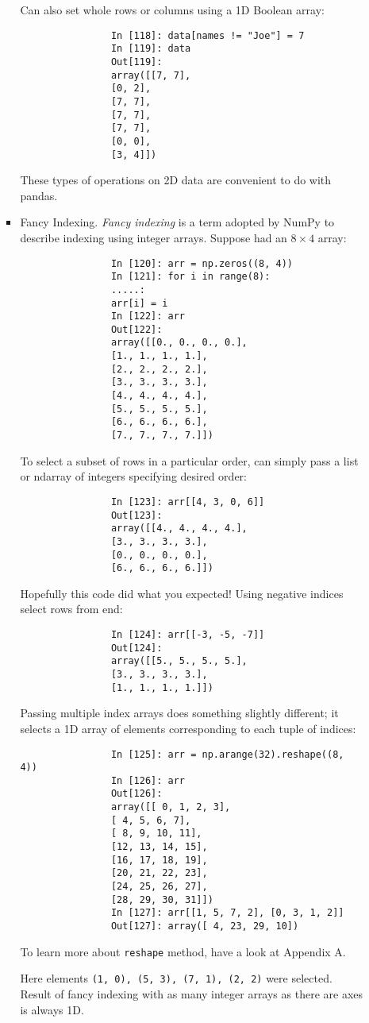 \documentclass{article}
\begin{document}
\begin{itemize}
\begin{itemize}
\begin{itemize}
			Can also set whole rows or columns using a 1D Boolean array:
			\begin{verbatim}
				In [118]: data[names != "Joe"] = 7
				In [119]: data
				Out[119]:
				array([[7, 7],
				[0, 2],
				[7, 7],
				[7, 7],
				[7, 7],
				[0, 0],
				[3, 4]])
			\end{verbatim}
			These types of operations on 2D data are convenient to do with pandas.
			\item {\sf Fancy Indexing.} {\it Fancy indexing} is a term adopted by NumPy to describe indexing using integer arrays. Suppose had an $8\times4$ array:
			\begin{verbatim}
				In [120]: arr = np.zeros((8, 4))
				In [121]: for i in range(8):
				.....:
				arr[i] = i
				In [122]: arr
				Out[122]:
				array([[0., 0., 0., 0.],
				[1., 1., 1., 1.],
				[2., 2., 2., 2.],
				[3., 3., 3., 3.],
				[4., 4., 4., 4.],
				[5., 5., 5., 5.],
				[6., 6., 6., 6.],
				[7., 7., 7., 7.]])
			\end{verbatim}
			To select a subset of rows in a particular order, can simply pass a list or ndarray of integers specifying desired order:
			\begin{verbatim}
				In [123]: arr[[4, 3, 0, 6]]
				Out[123]:
				array([[4., 4., 4., 4.],
				[3., 3., 3., 3.],
				[0., 0., 0., 0.],
				[6., 6., 6., 6.]])
			\end{verbatim}
			Hopefully this code did what you expected! Using negative indices select rows from end:
			\begin{verbatim}
				In [124]: arr[[-3, -5, -7]]
				Out[124]:
				array([[5., 5., 5., 5.],
				[3., 3., 3., 3.],
				[1., 1., 1., 1.]])
			\end{verbatim}
			Passing multiple index arrays does something slightly different; it selects a 1D array of elements corresponding to each tuple of indices:
			\begin{verbatim}
				In [125]: arr = np.arange(32).reshape((8, 4))
				In [126]: arr
				Out[126]:
				array([[ 0, 1, 2, 3],
				[ 4, 5, 6, 7],
				[ 8, 9, 10, 11],
				[12, 13, 14, 15],
				[16, 17, 18, 19],
				[20, 21, 22, 23],
				[24, 25, 26, 27],
				[28, 29, 30, 31]])
				In [127]: arr[[1, 5, 7, 2], [0, 3, 1, 2]]
				Out[127]: array([ 4, 23, 29, 10])
			\end{verbatim}
			To learn more about {\tt reshape} method, have a look at Appendix A.
			
			Here elements {\tt(1, 0), (5, 3), (7, 1), (2, 2)} were selected. Result of fancy indexing with as many integer arrays as there are axes is always 1D.
			

\end{itemize}
\end{itemize}
\end{itemize}
\end{document}
